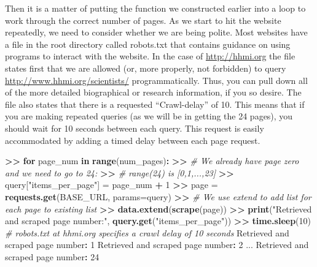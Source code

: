 \documentclass[]{krantz}
\newenvironment{Shaded}{\begin{snugshade}}{\end{snugshade}}
\newcommand{\KeywordTok}[1]{\textcolor[rgb]{0.13,0.29,0.53}{\textbf{#1}}}
\newcommand{\DataTypeTok}[1]{\textcolor[rgb]{0.13,0.29,0.53}{#1}}
\newcommand{\DecValTok}[1]{\textcolor[rgb]{0.00,0.00,0.81}{#1}}
\newcommand{\StringTok}[1]{\textcolor[rgb]{0.31,0.60,0.02}{#1}}
\newcommand{\CommentTok}[1]{\textcolor[rgb]{0.56,0.35,0.01}{\textit{#1}}}
\newcommand{\ControlFlowTok}[1]{\textcolor[rgb]{0.13,0.29,0.53}{\textbf{#1}}}
\newcommand{\OperatorTok}[1]{\textcolor[rgb]{0.81,0.36,0.00}{\textbf{#1}}}
\newcommand{\ErrorTok}[1]{\textcolor[rgb]{0.64,0.00,0.00}{\textbf{#1}}}
\newcommand{\NormalTok}[1]{#1}
\begin{document}
Then it is a matter of putting the function we constructed earlier into
a loop to work through the correct number of pages. As we start to hit
the website repeatedly, we need to consider whether we are being polite.
Most websites have a file in the root directory called robots.txt that
contains guidance on using programs to interact with the website. In the
case of \url{http://hhmi.org} the file states first that we are allowed
(or, more properly, not forbidden) to query
\url{http://www.hhmi.org/scientists/} programmatically. Thus, you can
pull down all of the more detailed biographical or research information,
if you so desire. The file also states that there is a requested
``Crawl-delay'' of 10. This means that if you are making repeated
queries (as we will be in getting the 24 pages), you should wait for 10
seconds between each query. This request is easily accommodated by
adding a timed delay between each page request.

\begin{Shaded}
\begin{Highlighting}[]
\OperatorTok{>}\ErrorTok{>}\StringTok{ }\ControlFlowTok{for}\NormalTok{ page_num }\ControlFlowTok{in} \KeywordTok{range}\NormalTok{(num_pages)}\OperatorTok{:}
\ErrorTok{>>}\StringTok{ }\CommentTok{# We already have page zero and we need to go to 24:}
\ErrorTok{>>}\StringTok{ }\CommentTok{# range(24) is [0,1,...,23]}
\ErrorTok{>>}\StringTok{    }\NormalTok{query[}\StringTok{"items_per_page"}\NormalTok{] =}\StringTok{ }\NormalTok{page_num }\OperatorTok{+}\StringTok{ }\DecValTok{1}
\OperatorTok{>}\ErrorTok{>}\StringTok{    }\NormalTok{page =}\StringTok{ }\KeywordTok{requests.get}\NormalTok{(BASE_URL, }\DataTypeTok{params=}\NormalTok{query)}
\OperatorTok{>}\ErrorTok{>}\StringTok{ }\CommentTok{# We use extend to add list for each page to existing list}
\ErrorTok{>>}\StringTok{    }\KeywordTok{data.extend}\NormalTok{(}\KeywordTok{scrape}\NormalTok{(page))}
\OperatorTok{>}\ErrorTok{>}\StringTok{ }\KeywordTok{print}\NormalTok{(}\StringTok{"Retrieved and scraped page number:"}\NormalTok{, }\KeywordTok{query.get}\NormalTok{(}\StringTok{"items_per_page"}\NormalTok{))}
\OperatorTok{>}\ErrorTok{>}\StringTok{ }\KeywordTok{time.sleep}\NormalTok{(}\DecValTok{10}\NormalTok{) }\CommentTok{# robots.txt at hhmi.org specifies a crawl delay of 10 seconds}
\NormalTok{Retrieved and scraped page number}\OperatorTok{:}\StringTok{ }\DecValTok{1}
\NormalTok{Retrieved and scraped page number}\OperatorTok{:}\StringTok{ }\DecValTok{2}
\NormalTok{...}
\NormalTok{Retrieved and scraped page number}\OperatorTok{:}\StringTok{ }\DecValTok{24}
\end{Highlighting}
\end{Shaded}
\end{document}
